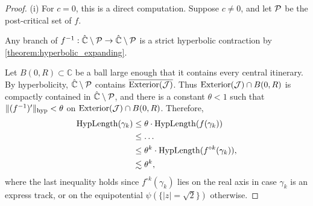 \begin{proof} \leavevmode
(i) For $c=0$, this is a direct computation. 
Suppose $c \neq 0$, and let $\operatorname{\mathcal P}$ be the post-critical set of $f$.





Any branch of $f^{-1}: \hat{\mathbb C} \setminus \operatorname{\mathcal P} \to \hat{\mathbb C} \setminus \operatorname{\mathcal P}$
is a strict hyperbolic contraction by \cref{theorem:hyperbolic_expanding}.


Let $B(0,R) \subset \mathbb{C}$ be a ball large enough that it contains every central itinerary. 
By hyperbolicity, $\hat{\mathbb C} \setminus \operatorname{\mathcal P}$ contains $\overline{\operatorname{Exterior}(\mathcal{J})}$.
Thus $\operatorname{Exterior}(\mathcal{J}) \cap B(0,R)$ is compactly contained in $\hat{\mathbb C} \setminus \operatorname{\mathcal P}$, and
there is a constant $\theta<1$ such that $\Vert (f^{-1})' \Vert_{\operatorname{hyp}}< \theta$ on $\operatorname{Exterior}(\mathcal{J}) \cap B(0,R)$. Therefore,
\begin{align*}
\operatorname{HypLength}(\gamma_k)  & \leq \theta \cdot \operatorname{HypLength}(f(\gamma_k))\\ & \leq  \dots
	\\ & \leq \theta^k \cdot \operatorname{HypLength}(f^{\circ k}(\gamma_k)),
	\\ & \lesssim \theta^k,
\end{align*}
where the last inequality holds since $f^{\circ k}(\gamma_k)$ lies 
on the real axis in case $\gamma_k$ is an express track, 
or on the equipotential $\psi(\{ |z| = \sqrt 2\})$ otherwise.


\end{proof}
